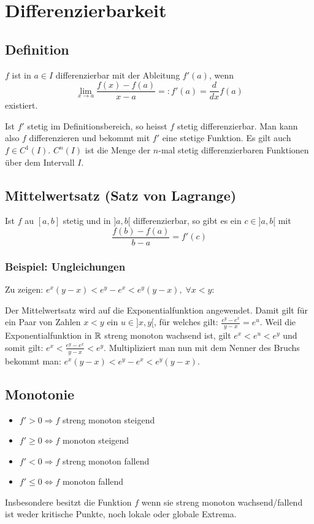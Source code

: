 \section{Differenzierbarkeit}
\subsection{Definition}
$f$ ist in $a \in I$ differenzierbar mit der Ableitung $f'(a)$, wenn
\[
\lim_{x \to a} \frac{f(x) - f(a)}{x - a} =: f'(a) = \frac{d}{dx}f(a)
\]
existiert.

Ist $f'$ stetig im Definitionsbereich, so heisst $f$ stetig differenzierbar. Man
kann also $f$ differenzieren und bekommt mit $f'$ eine stetige Funktion. Es gilt
auch $f \in C^1(I)$. $C^n(I)$ ist die Menge der $n$-mal stetig differenzierbaren
Funktionen über dem Intervall $I$.

\subsection{Mittelwertsatz (Satz von Lagrange)}
Ist $f$ au $[a,b]$ stetig und in $]a, b[$ differenzierbar, so gibt es ein $c
\in ]a,b[$ mit
\[
\frac{f(b) - f(a)}{b-a} = f'(c)
\]

\subsubsection{Beispiel: Ungleichungen}
Zu zeigen: $e^x(y-x) < e^y - e^x < e^y(y-x), \; \forall x < y$:


Der Mittelwertsatz wird auf die Exponentialfunktion angewendet. Damit gilt für
ein Paar von Zahlen $x < y$ ein $u \in ]x,y[$, für welches gilt: $\frac{e^y
- e^x}{y-x} = e^u$. Weil die Exponentialfunktion in $\mathbb{R}$ streng monoton wachsend
ist, gilt $e^x < e^u < e^y$ und somit gilt: $e^x < \frac{e^y-e^x}{y-x} < e^y$.
Multipliziert man nun mit dem Nenner des Bruchs bekommt man: $e^x (y-x) < e^y -
e^x < e^y(y-x)$.

\subsection{Monotonie}
\begin{itemize}
	\item $f' > 0 \Rightarrow f$ streng monoton steigend
	\item $f' \geq 0 \Leftrightarrow f$ monoton steigend
	\item $f' < 0 \Rightarrow f$ streng monoton fallend
	\item $f' \leq 0 \Leftrightarrow f$ monoton fallend
\end{itemize}
Insbesondere besitzt die Funktion $f$ wenn sie streng monoton wachsend/fallend ist
weder kritische Punkte, noch lokale oder globale Extrema.

